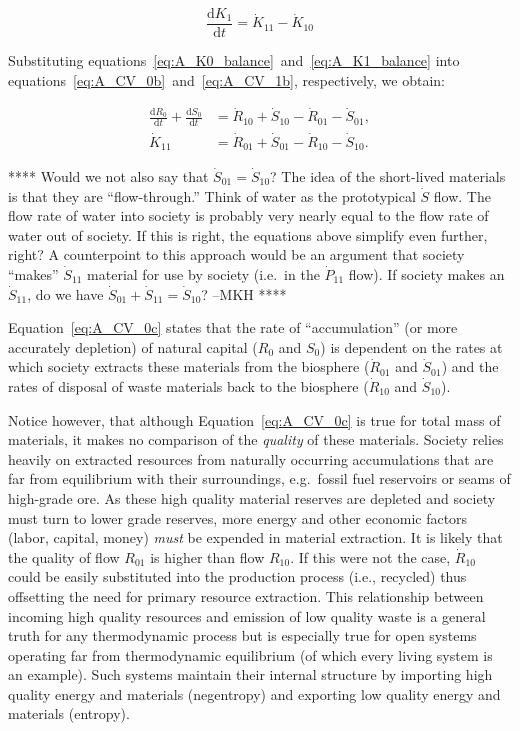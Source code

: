 \begin{equation}\label{eq:A_K1_balance}
	\frac{\mathrm{d}K_{1}}{\mathrm{d}t}		
	= \dot{K}_{11}
	- \dot{K}_{10}
\end{equation}

Substituting equations~\ref{eq:A_K0_balance}~and~\ref{eq:A_K1_balance}
into equations~\ref{eq:A_CV_0b}~and~\ref{eq:A_CV_1b}, respectively, we obtain:

\begin{align}\label{eq:A_CV_0c}
	\frac{\mathrm{d}R_0}{\mathrm{d}t}		
	+	\frac{\mathrm{d}S_0}{\mathrm{d}t}		&	
	=	\dot{R}_{10}		
	+	\dot{S}_{10}	
	-	\dot{R}_{01}											
	-	\dot{S}_{01},							\\
	\label{eq:A_CV_1c}
	\dot{K}_{11}								&
	= \dot{R}_{01} 
	+ \dot{S}_{01} 
	- \dot{R}_{10}				
	- \dot{S}_{10}.
\end{align}

**** Would we not also say that $\dot{S}_{01} = \dot{S}_{10}$? 
The idea of the short-lived materials is that they are ``flow-through.''
Think of water as the prototypical $\dot{S}$ flow. 
The flow rate of water into society is probably very nearly equal
to the flow rate of water out of society. 
If this is right, the equations above simplify even further, right? 
A counterpoint to this approach would be an argument that society
``makes'' $\dot{S}_{11}$ material for use by society (i.e.\ in the $\dot{P}_{11}$ flow).
If society makes an $\dot{S}_{11}$, do we have
$\dot{S}_{01} + \dot{S}_{11} = \dot{S}_{10}$?  --MKH ****

Equation~\ref{eq:A_CV_0c} states that the rate of ``accumulation'' 
(or more accurately depletion) of natural capital ($R_{0}$ and $S_{0}$) 
is dependent on the rates at which society extracts these materials
from the biosphere ($\dot{R}_{01}$ and $\dot{S}_{01}$) and the rates
of disposal of waste materials back to the biosphere ($\dot{R}_{10}$ 
and $\dot{S}_{10}$). 

Notice however, that although Equation~\ref{eq:A_CV_0c} is true for total mass of materials,
it makes no comparison of the \emph{quality} of these materials.
Society relies heavily on extracted resources from naturally
occurring accumulations that are far from equilibrium with their surroundings,
e.g.\ fossil fuel reservoirs or seams of high-grade ore. As these high quality
material reserves are depleted and society must turn to lower grade reserves, 
more energy and other economic factors (labor, capital, money) \emph{must} be 
expended  in material extraction.\cite{Mudd2010} It is likely that the quality
of flow $R_{01}$ is higher than flow $R_{10}$. If this were not the case,
$\dot{R}_{10}$ could be easily substituted into the production process (i.e., recycled) thus
offsetting the need for primary resource extraction. This relationship between 
incoming high quality resources and emission of low
quality waste is a general truth for any thermodynamic process but is especially
true for open systems operating far from thermodynamic equilibrium (of which every
living system is an example). Such systems maintain their internal structure by
importing high quality energy and materials (negentropy) and exporting low quality
energy and materials (entropy).\cite{Schroedinger1947} 

